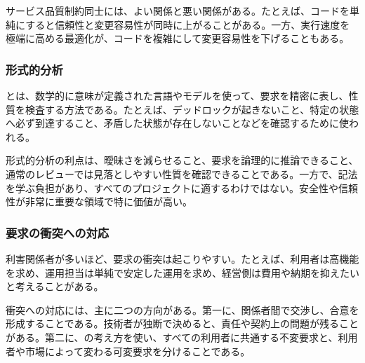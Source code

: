 サービス品質制約同士には、よい関係と悪い関係がある。たとえば、コードを単純にすると信頼性と変更容易性が同時に上がることがある。一方、実行速度を極端に高める最適化が、コードを複雑にして変更容易性を下げることもある。

\subsubsection{形式的分析}

とは、数学的に意味が定義された言語やモデルを使って、要求を精密に表し、性質を検査する方法である。たとえば、デッドロックが起きないこと、特定の状態へ必ず到達すること、矛盾した状態が存在しないことなどを確認するために使われる。

形式的分析の利点は、曖昧さを減らせること、要求を論理的に推論できること、通常のレビューでは見落としやすい性質を確認できることである。一方で、記法を学ぶ負担があり、すべてのプロジェクトに適するわけではない。安全性や信頼性が非常に重要な領域で特に価値が高い。

\subsubsection{要求の衝突への対応}

利害関係者が多いほど、要求の衝突は起こりやすい。たとえば、利用者は高機能を求め、運用担当は単純で安定した運用を求め、経営側は費用や納期を抑えたいと考えることがある。

衝突への対応には、主に二つの方向がある。第一に、関係者間で交渉し、合意を形成することである。技術者が独断で決めると、責任や契約上の問題が残ることがある。第二に、の考え方を使い、すべての利用者に共通する不変要求と、利用者や市場によって変わる可変要求を分けることである。

